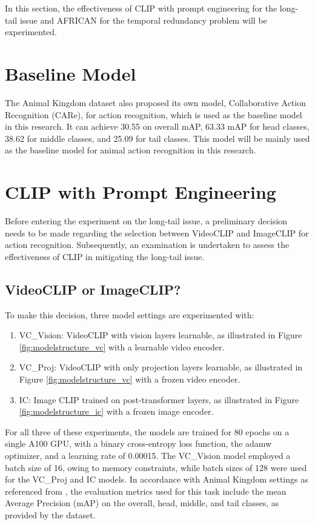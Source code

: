 In this section, the effectiveness of CLIP with prompt engineering for the long-tail issue and AFRICAN for the temporal redundancy problem will be experimented.

\section {Baseline Model}
The Animal Kingdom dataset also proposed its own model, Collaborative Action Recognition (CARe), for action recognition, which is used as the baseline model in this research. It can achieve 30.55 on overall mAP, 63.33 mAP for head classes, 38.62 for middle classes, and 25.09 for tail classes. This model will be mainly used as the baseline model for animal action recognition in this research.

\section{CLIP with Prompt Engineering}
Before entering the experiment on the long-tail issue, a preliminary decision needs to be made regarding the selection between VideoCLIP and ImageCLIP for action recognition. Subsequently, an examination is undertaken to assess the effectiveness of CLIP in mitigating the long-tail issue.

\subsection{VideoCLIP or ImageCLIP?}
\label{sec:imageclipbetter}
 To make this decision, three model settings are experimented with: 

\begin{enumerate}
    \item VC\_Vision: VideoCLIP with vision layers learnable, as illustrated in Figure \ref{fig:modelstructure_vc} with a learnable video encoder.
    \item VC\_Proj: VideoCLIP with only projection layers learnable, as illustrated in Figure \ref{fig:modelstructure_vc} with a frozen video encoder.
    \item IC: Image CLIP trained on post-transformer layers, as illustrated in Figure \ref{fig:modelstructure_ic} with a frozen image encoder.
\end{enumerate}

For all three of these experiments, the models are trained for 80 epochs on a single A100 GPU, with a binary cross-entropy loss function, the adamw optimizer, and a learning rate of 0.00015. The VC\_Vision model employed a batch size of 16, owing to memory constraints, while batch sizes of 128 were used for the VC\_Proj and IC models. In accordance with Animal Kingdom settings as referenced from \parencite{ng2022animal}, the evaluation metrics used for this task include the mean Average Precision (mAP) on the overall, head, middle, and tail classes, as provided by the dataset. 

